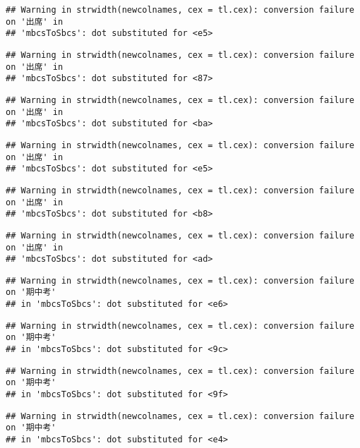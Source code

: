 \documentclass[
]{book}
\begin{document}
\begin{verbatim}
## Warning in strwidth(newcolnames, cex = tl.cex): conversion failure on '出席' in
## 'mbcsToSbcs': dot substituted for <e5>
\end{verbatim}

\begin{verbatim}
## Warning in strwidth(newcolnames, cex = tl.cex): conversion failure on '出席' in
## 'mbcsToSbcs': dot substituted for <87>
\end{verbatim}

\begin{verbatim}
## Warning in strwidth(newcolnames, cex = tl.cex): conversion failure on '出席' in
## 'mbcsToSbcs': dot substituted for <ba>
\end{verbatim}

\begin{verbatim}
## Warning in strwidth(newcolnames, cex = tl.cex): conversion failure on '出席' in
## 'mbcsToSbcs': dot substituted for <e5>
\end{verbatim}

\begin{verbatim}
## Warning in strwidth(newcolnames, cex = tl.cex): conversion failure on '出席' in
## 'mbcsToSbcs': dot substituted for <b8>
\end{verbatim}

\begin{verbatim}
## Warning in strwidth(newcolnames, cex = tl.cex): conversion failure on '出席' in
## 'mbcsToSbcs': dot substituted for <ad>
\end{verbatim}

\begin{verbatim}
## Warning in strwidth(newcolnames, cex = tl.cex): conversion failure on '期中考'
## in 'mbcsToSbcs': dot substituted for <e6>
\end{verbatim}

\begin{verbatim}
## Warning in strwidth(newcolnames, cex = tl.cex): conversion failure on '期中考'
## in 'mbcsToSbcs': dot substituted for <9c>
\end{verbatim}

\begin{verbatim}
## Warning in strwidth(newcolnames, cex = tl.cex): conversion failure on '期中考'
## in 'mbcsToSbcs': dot substituted for <9f>
\end{verbatim}

\begin{verbatim}
## Warning in strwidth(newcolnames, cex = tl.cex): conversion failure on '期中考'
## in 'mbcsToSbcs': dot substituted for <e4>
\end{verbatim}
\end{document}

